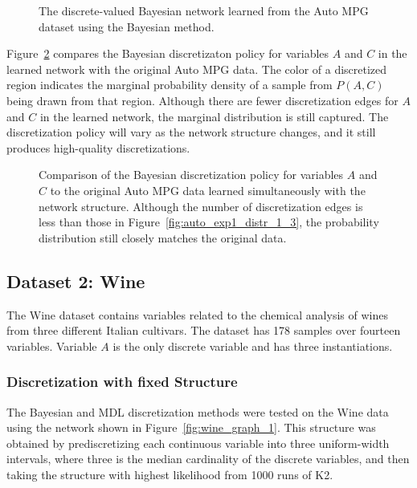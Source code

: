 \begin{figure}[ht]
  \centering
  
  \caption{The discrete-valued Bayesian network learned from the Auto MPG dataset using the Bayesian method.}
  \label{fig:auto_graph_2}
\end{figure}

Figure~\ref{fig:auto_exp2_distr_1_3} compares the Bayesian discretizaton policy for variables $A$ and $C$ in the learned network with the original Auto MPG data.
The color of a discretized region indicates the marginal probability density of a sample from $P(A,C)$ being drawn from that region.
Although there are fewer discretization edges for $A$ and $C$ in the learned network, the marginal distribution is still captured.
The discretization policy will vary as the network structure changes, and it still produces high-quality discretizations.

\begin{figure}[ht]
  \centering
  
  \caption{
    Comparison of the Bayesian discretization policy for variables $A$ and $C$ to the original Auto MPG data learned simultaneously with the network structure.
    Although the number of discretization edges is less than those in Figure~\ref{fig:auto_exp1_distr_1_3}, the probability distribution still closely matches the original data.
  }
  \label{fig:auto_exp2_distr_1_3}
\end{figure}

%
\subsection{Dataset 2: Wine}
\label{subsec:wine}

The Wine dataset contains variables related to the chemical analysis of wines from three different Italian cultivars.
The dataset has \num{178} samples over fourteen variables.
Variable $A$ is the only discrete variable and has three instantiations.

\subsubsection{Discretization with fixed Structure}
\label{subsubsec:wine_exp1}

The Bayesian and MDL discretization methods were tested on the Wine data using the network shown in Figure~\ref{fig:wine_graph_1}.
This structure was obtained by prediscretizing each continuous variable into three uniform-width intervals, where three is the median cardinality of the discrete variables, and then taking the structure with highest likelihood from \num{1000} runs of K2.

